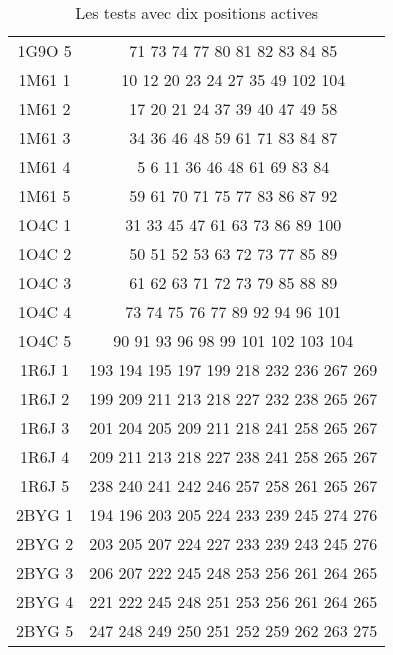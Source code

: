 \begin{table}[!htbp]
{\begin{tabular}{cc}
        1G9O 5  & 71 73 74 77 80 81 82 83 84 85 \\
        1M61 1  & 10 12 20 23 24 27 35 49 102 104 \\
        1M61 2  & 17 20 21 24 37 39 40 47 49 58 \\
        1M61 3  & 34 36 46 48 59 61 71 83 84 87 \\
        1M61 4  & 5 6 11 36 46 48 61 69 83 84 \\
        1M61 5  & 59 61 70 71 75 77 83 86 87 92 \\
        1O4C 1  & 31 33 45 47 61 63 73 86 89 100 \\
        1O4C 2  & 50 51 52 53 63 72 73 77 85 89 \\
        1O4C 3  & 61 62 63 71 72 73 79 85 88 89 \\
        1O4C 4  & 73 74 75 76 77 89 92 94 96 101 \\
        1O4C 5  & 90 91 93 96 98 99 101 102 103 104 \\
        1R6J 1  & 193 194 195 197 199 218 232 236 267 269 \\
        1R6J 2  & 199 209 211 213 218 227 232 238 265 267 \\
        1R6J 3  & 201 204 205 209 211 218 241 258 265 267 \\
        1R6J 4  & 209 211 213 218 227 238 241 258 265 267 \\
        1R6J 5  & 238 240 241 242 246 257 258 261 265 267 \\
        2BYG 1  & 194 196 203 205 224 233 239 245 274 276 \\
        2BYG 2  & 203 205 207 224 227 233 239 243 245 276 \\
        2BYG 3  & 206 207 222 245 248 253 256 261 264 265 \\
        2BYG 4  & 221 222 245 248 251 253 256 261 264 265 \\
        2BYG 5  & 247 248 249 250 251 252 259 262 263 275 \\

        \bottomrule

      \end{tabular}
}      
      \caption{Les tests avec dix positions actives}
\label{tab:test10}      
    \end{table}


